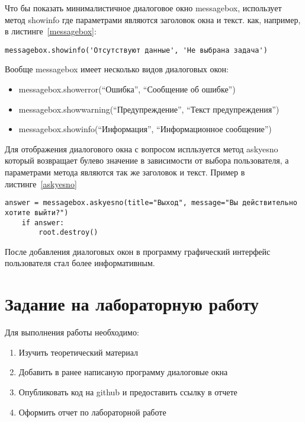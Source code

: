 \documentclass[a4paper]{article}
\begin{document}
Что бы показать минималистичное диалоговое окно messagebox, использует метод showinfo где параметрами являются заголовок окна и текст. как, например, в листинге~\ref{messagebox}:

\newpage
\begin{lstlisting}[label=messagebox,caption=Добавление новой записи]
  messagebox.showinfo('Отсутствуют данные', 'Не выбрана задача')
\end{lstlisting}

Вообще messagebox имеет несколько видов диалоговых окон:

\begin{itemize}
        \item messagebox.showerror(``Ошибка'', ``Сообщение об ошибке'')
        \item messagebox.showwarning(``Предупреждение'', ``Текст предупреждения'')
        \item messagebox.showinfo(``Информация'', ``Информационное сообщение'')
\end{itemize}

Для отображения диалогового окна с вопросом испльзуется метод askyesno который возвращает булево значение в зависимости от выбора пользователя, а параметрами метода являются так же заголовок и текст. Пример в листинге~\ref{askyesno}

\begin{lstlisting}[label=askyesno,caption=Добавление новой записи]
    answer = messagebox.askyesno(title="Выход", message="Вы действительно хотите выйти?")
    if answer:
        root.destroy()
\end{lstlisting}

После добавления диалоговых окон в программу графический интерфейс пользователя стал более информативным.



\newpage
\section{Задание на лабораторную работу}

Для выполнения работы необходимо:
\begin{enumerate}
  \item Изучить теоретический материал
  \item Добавить в ранее написаную программу диалоговые окна
  \item Опубликовать код на github и предоставить ссылку в отчете
  \item Оформить отчет по лабораторной работе
\end{enumerate}
\end{document}

